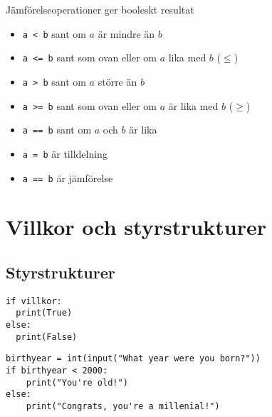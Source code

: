 \begin{frame}[fragile]
  \begin{block}{Jämförelseoperationer ger booleskt resultat}
    \begin{itemize}
      \item \lstinline{a < b} sant om \(a\) är mindre än \(b\)
      \item \lstinline{a <= b} sant som ovan eller om \(a\) lika med \(b\) 
        (\(\leq\))
      \item \lstinline{a > b} sant om \(a\) större än \(b\)
      \item \lstinline{a >= b} sant som ovan eller om \(a\) är lika med \(b\) 
        (\(\geq\))
      \item \lstinline{a == b} sant om \(a\) och \(b\) är lika
    \end{itemize}
  \end{block}

  \pause

  \begin{remark}
    \begin{itemize}
      \item \lstinline{a = b} är tilldelning
      \item \lstinline{a == b} är jämförelse
    \end{itemize}
  \end{remark}
\end{frame}


\section{Villkor och styrstrukturer}

\subsection{Styrstrukturer}

\begin{frame}[fragile]
  \begin{lstlisting}[basicstyle=\Large,numbers=none]
if villkor:
  print(True)
else:
  print(False)
  \end{lstlisting}
\end{frame}

\begin{frame}[fragile]
  \begin{example}
    \begin{lstlisting}
birthyear = int(input("What year were you born?"))
if birthyear < 2000:
    print("You're old!")
else:
    print("Congrats, you're a millenial!")
    \end{lstlisting}
  \end{example}
\end{frame}

